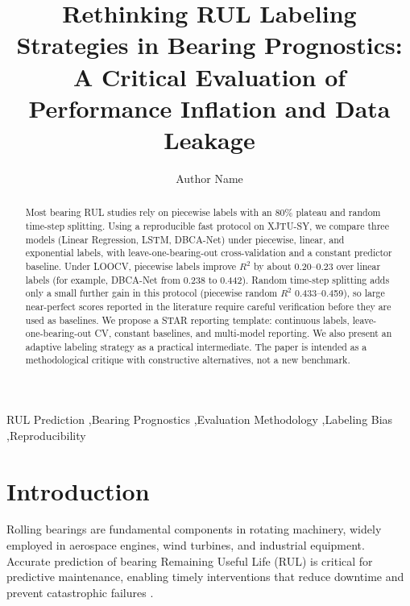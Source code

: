 \documentclass[5p,twocolumn]{elsarticle}
\begin{document}
\begin{frontmatter}

\title{Rethinking RUL Labeling Strategies in Bearing Prognostics: A Critical Evaluation of Performance Inflation and Data Leakage}

\author[1]{Author Name}
\address[1]{School of Mechanical Engineering, University, City, Country}

\begin{abstract}
Most bearing RUL studies rely on piecewise labels with an 80\% plateau and random time-step splitting. Using a reproducible fast protocol on XJTU-SY, we compare three models (Linear Regression, LSTM, DBCA-Net) under piecewise, linear, and exponential labels, with leave-one-bearing-out cross-validation and a constant predictor baseline. Under LOOCV, piecewise labels improve $R^2$ by about 0.20--0.23 over linear labels (for example, DBCA-Net from 0.238 to 0.442). Random time-step splitting adds only a small further gain in this protocol (piecewise random $R^2$ 0.433--0.459), so large near-perfect scores reported in the literature require careful verification before they are used as baselines. We propose a STAR reporting template: continuous labels, leave-one-bearing-out CV, constant baselines, and multi-model reporting. We also present an adaptive labeling strategy as a practical intermediate. The paper is intended as a methodological critique with constructive alternatives, not a new benchmark.
\end{abstract}

\begin{keyword}
RUL Prediction \sep Bearing Prognostics \sep Evaluation Methodology \sep Labeling Bias \sep Reproducibility
\end{keyword}

\end{frontmatter}


\section{Introduction}
\label{sec:intro}

Rolling bearings are fundamental components in rotating machinery, widely employed in aerospace engines, wind turbines, and industrial equipment. Accurate prediction of bearing Remaining Useful Life (RUL) is critical for predictive maintenance, enabling timely interventions that reduce downtime and prevent catastrophic failures \cite{lei2018machinery, zhao2019deep}.
\end{document}
